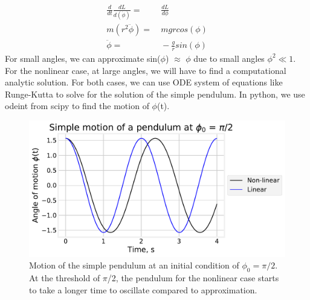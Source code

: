 \documentclass[11pt]{article}
\begin{document}
    
    \begin{align*}
        \frac{d}{dt} \frac{dL}{d(\Dot{\phi})} = & \ \frac{dL}{d\phi} \\
        m(r^2 \ddot{\phi}) = & \  mgrcos(\phi) \\
        \ddot{\phi} = & \ -\frac{g}{r}sin(\phi)
    \end{align*}
    For small angles, we can approximate sin($\phi$) $\approx $ $\phi$ due to small angles $\phi^2 \ll 1$. For the nonlinear case, at large angles, we will have to find a computational analytic solution. For both cases, we can use ODE system of equations like Runge-Kutta to solve for the solution of the simple pendulum. In python, we use odeint from scipy to find the motion of $\phi$(t). 
\begin{figure}[H]
    \centering
    \includegraphics[width = 12 cm]{src/Pendulum.pdf}
    \caption{Motion of the simple pendulum at an initial condition of $\phi_0 = \pi/2$. At the threshold of $\pi$/2, the pendulum for the nonlinear case starts to take a longer time to  oscillate compared to approximation.}
    \label{fig:my_label}
\end{figure}
\end{document}

